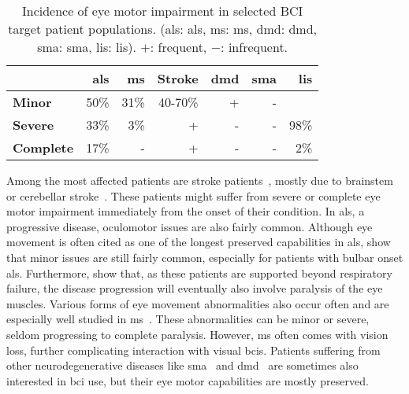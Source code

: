\begin{table}[h]
  \sffamily
  \footnotesize
	\centering
	\begin{tabular}{@{}l|rrrrr|r@{}}
    & \bfseries \acs{als} & \bfseries \acs{ms}   & \bfseries Stroke &\bfseries\acs{dmd} &\bfseries \acs{sma} &\bfseries \acs{lis} \\ \hline
		\bfseries Minor    & 50\% & 31\% & 40-70\% & + & - &      \\
		\bfseries Severe   & 33\% & 3\%  & +       & - & - & 98\% \\
		\bfseries Complete & 17\% & -    & +       & - & - & 2\%  \\
	\end{tabular}
	\caption{Incidence of eye motor impairment in selected BCI target
    patient populations. (\acs{als}: \acl{als}, \acs{ms}: \acl{ms}, \acs{dmd}:
    \acl{dmd}, \acs{sma}: \acl{sma}, \acs{lis}: \acl{lis}).
    $+$: frequent, $-$: infrequent.}
    \label{tab:incidence}
\end{table}

Among the most affected patients are stroke patients~\cite{Pollock2011}, mostly
due to brainstem or cerebellar stroke~\cite{Moncayo2009,Bogousslavsky1987}.
These patients might suffer from severe or complete eye motor impairment
immediately from the onset of their condition.
In \ac{als}, a progressive disease, oculomotor issues are also fairly common.
Although eye movement is often cited as one of the longest preserved
capabilities in \ac{als}, \textcite{Guo2022} show that minor issues are still
fairly common,
especially for patients with bulbar onset \ac{als}.
Furthermore, \textcite{Hayashi1991} show that, as these patients are supported beyond
respiratory failure, the disease progression will eventually also involve
paralysis of the eye muscles.
Various forms of eye movement abnormalities also occur often and are especially well studied in
\ac{ms}~\cite{Mueri1985,Prasad2010,Castelnovo2016,Serra2018,Polet2020}.
These abnormalities can be minor or severe, seldom progressing to complete
paralysis.
However, \ac{ms} often comes with vision loss, further complicating interaction
with visual \acp{bci}.
Patients suffering from other neurodegenerative diseases like
\ac{sma}~\cite{Anagnostou2021} and \ac{dmd}~\cite{Lui2001} are
sometimes also interested in \ac{bci} use, but their eye motor capabilities are
mostly preserved.

